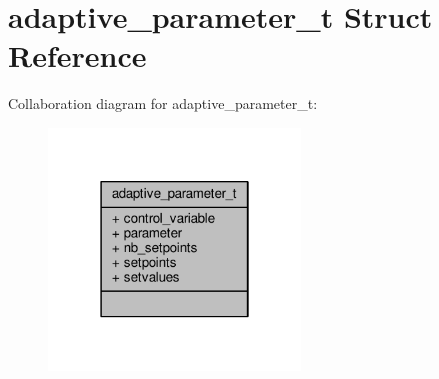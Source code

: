 \hypertarget{structadaptive__parameter__t}{\section{adaptive\+\_\+parameter\+\_\+t Struct Reference}
\label{structadaptive__parameter__t}
}


Collaboration diagram for adaptive\+\_\+parameter\+\_\+t\+:
\nopagebreak
\begin{figure}[H]
\begin{center}
\leavevmode
\includegraphics[width=190pt]{structadaptive__parameter__t__coll__graph}
\end{center}
\end{figure}
